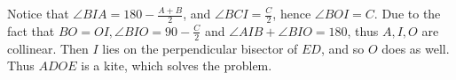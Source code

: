 Notice that $\angle BIA=180-\frac{A+B}{2}$, and $\angle BCI=\frac{C}{2}$, hence $\angle BOI=C$.
Due to the fact that $BO=OI, \angle BIO=90-\frac{C}{2}$ and $\angle AIB+\angle BIO=180$, thus $A,I,O$ are collinear.
Then $I$ lies on the perpendicular bisector of $ED$, and so $O$ does as well.
Thus $ADOE$ is a kite, which solves the problem.
